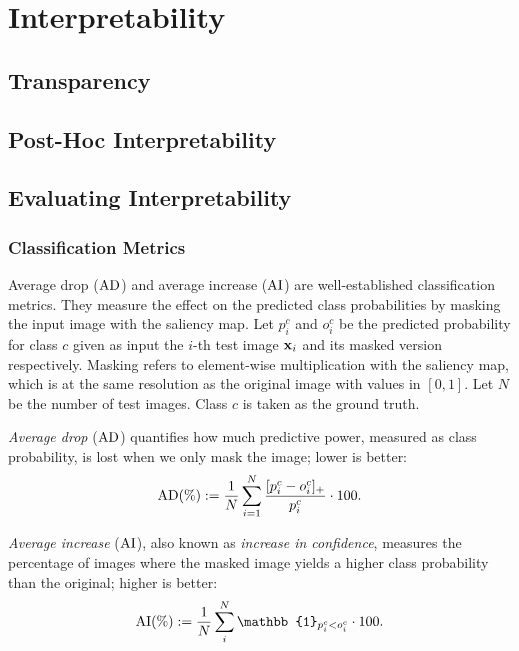 \section*{Interpretability}
\label{rel:sec_int}

\subsection*{Transparency}
\label{rel:sub_transp}

\subsection*{Post-Hoc Interpretability}
\label{rel:sub_post}

\subsection*{Evaluating Interpretability}
\subsubsection*{Classification Metrics}
Average drop ($\operatorname{AD}$) and average increase ($\operatorname{AI}$) \autocite{chattopadhay2018grad} are 
well-established classification metrics. 
They measure the effect on the predicted class probabilities by masking the input image with the
 saliency map. Let $p^c_i$ and $o^c_i$ be the predicted probability for class $c$ given as input 
 the $i$-th test image $\mathbf{x}_i$ and its masked version respectively. 
Masking refers to element-wise multiplication with the saliency map, which is at the same 
resolution as the original image with values in $[0,1]$. 
Let $N$ be the number of test images. Class $c$ is taken as the ground truth.

\emph{Average drop} ($\operatorname{AD}$) quantifies how much predictive power, measured as class probability, 
is lost when we only mask the image; lower is better:
\begin{equation}
	\operatorname{AD}(\%) \mathrel{:=} \frac{1}{N} \sum_{i=1}^N \frac{[p^c_i - o^c_i]_+}{p^c_i} \cdot 100.
\label{eq:ad}
\end{equation}

\emph{Average increase} ($\operatorname{AI}$), also known as \emph{increase in confidence}, measures the 
percentage of images where the masked image yields a higher class probability than the original; 
higher is better:
\begin{equation}
	\AI(\%) \defn \frac{1}{N} \sum_i^N \mathbb{1}_{p^c_i < o^c_i} \cdot 100.
\label{eq:ai}
\end{equation}

